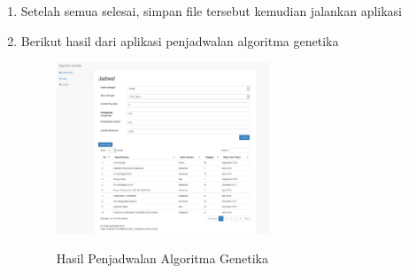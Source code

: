 \begin{enumerate}
    	\item Setelah semua selesai, simpan file tersebut kemudian jalankan aplikasi
    	
        \item Berikut hasil dari aplikasi penjadwalan algoritma genetika
    		\begin{figure}[!htbp]
        		\centering
        		\caption{Hasil Penjadwalan Algoritma Genetika}
        		\includegraphics[width=0.6\textwidth]{figures/GA15.png}
        		\label{GA15}
    		\end{figure}
\end{enumerate}